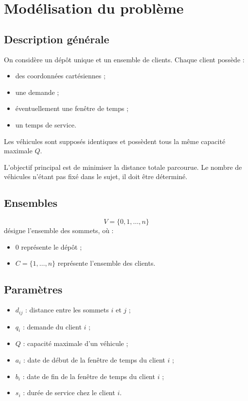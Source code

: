 \documentclass[11pt,a4paper]{article}
\begin{document}
\section{Modélisation du problème}

\subsection{Description générale}
On considère un dépôt unique et un ensemble de clients. Chaque client possède :
\begin{itemize}
    \item des coordonnées cartésiennes ;
    \item une demande ;
    \item éventuellement une fenêtre de temps ;
    \item un temps de service.
\end{itemize}

Les véhicules sont supposés identiques et possèdent tous la même capacité maximale \(Q\).

L'objectif principal est de minimiser la distance totale parcourue. Le nombre de véhicules n'étant pas fixé dans le sujet, il doit être déterminé.

\subsection{Ensembles}
\[
V = \{0,1,\dots,n\}
\]
désigne l'ensemble des sommets, où :
\begin{itemize}
    \item \(0\) représente le dépôt ;
    \item \(C = \{1,\dots,n\}\) représente l'ensemble des clients.
\end{itemize}

\subsection{Paramètres}
\begin{itemize}
    \item \(d_{ij}\) : distance entre les sommets \(i\) et \(j\) ;
    \item \(q_i\) : demande du client \(i\) ;
    \item \(Q\) : capacité maximale d'un véhicule ;
    \item \(a_i\) : date de début de la fenêtre de temps du client \(i\) ;
    \item \(b_i\) : date de fin de la fenêtre de temps du client \(i\) ;
    \item \(s_i\) : durée de service chez le client \(i\).
\end{itemize}
\end{document}
